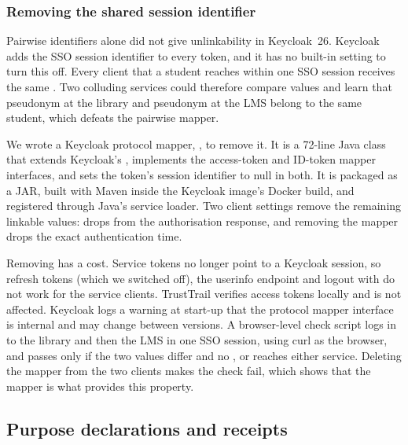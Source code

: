 \subsubsection{Removing the shared session identifier}
Pairwise identifiers alone did not give unlinkability in Keycloak~26. Keycloak adds the SSO session identifier  to every token, and it has no built-in setting to turn this off. Every client that a student reaches within one SSO session receives the same . Two colluding services could therefore compare  values and learn that pseudonym  at the library and pseudonym  at the LMS belong to the same student, which defeats the pairwise mapper.

We wrote a Keycloak protocol mapper, , to remove it. It is a 72-line Java class that extends Keycloak's , implements the access-token and ID-token mapper interfaces, and sets the token's session identifier to null in both. It is packaged as a JAR, built with Maven inside the Keycloak image's Docker build, and registered through Java's service loader. Two client settings remove the remaining linkable values:  drops  from the authorisation response, and removing the  mapper drops the exact authentication time.

Removing  has a cost. Service tokens no longer point to a Keycloak session, so refresh tokens (which we switched off), the userinfo endpoint and logout with  do not work for the service clients. TrustTrail verifies access tokens locally and is not affected. Keycloak logs a warning at start-up that the protocol mapper interface is internal and may change between versions. A browser-level check script logs in to the library and then the LMS in one SSO session, using curl as the browser, and passes only if the two  values differ and no ,  or  reaches either service. Deleting the mapper from the two clients makes the  check fail, which shows that the mapper is what provides this property.

\subsection{Purpose declarations and receipts}
\label{sec:design-declarations}

